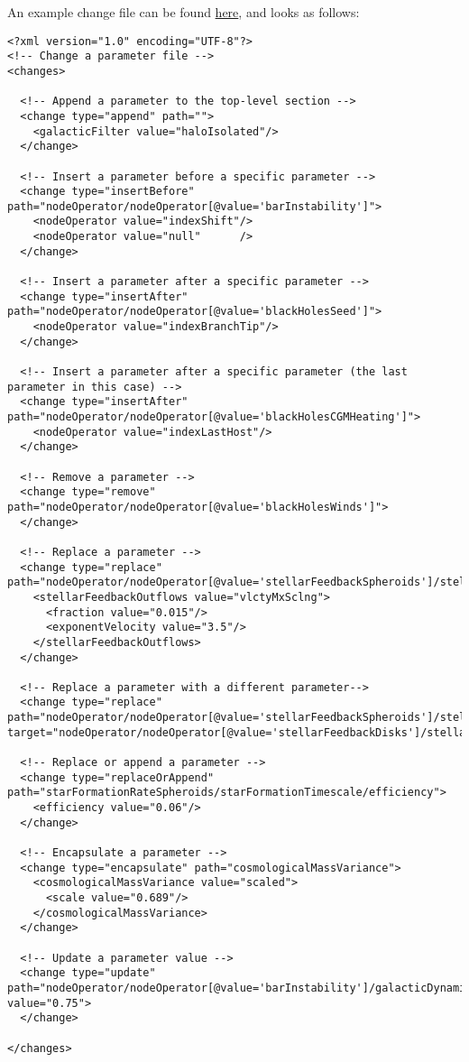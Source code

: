 An example change file can be found \href{https://raw.githubusercontent.com/galacticusorg/galacticus/master/testSuite/parameters/changes.xml}{here}, and looks as follows:
\begin{verbatim}
<?xml version="1.0" encoding="UTF-8"?>
<!-- Change a parameter file -->
<changes>

  <!-- Append a parameter to the top-level section -->
  <change type="append" path="">
    <galacticFilter value="haloIsolated"/>
  </change>

  <!-- Insert a parameter before a specific parameter -->
  <change type="insertBefore" path="nodeOperator/nodeOperator[@value='barInstability']">
    <nodeOperator value="indexShift"/>
    <nodeOperator value="null"      />
  </change>

  <!-- Insert a parameter after a specific parameter -->
  <change type="insertAfter" path="nodeOperator/nodeOperator[@value='blackHolesSeed']">
    <nodeOperator value="indexBranchTip"/>
  </change>

  <!-- Insert a parameter after a specific parameter (the last parameter in this case) -->
  <change type="insertAfter" path="nodeOperator/nodeOperator[@value='blackHolesCGMHeating']">
    <nodeOperator value="indexLastHost"/>
  </change>

  <!-- Remove a parameter -->
  <change type="remove" path="nodeOperator/nodeOperator[@value='blackHolesWinds']">
  </change>

  <!-- Replace a parameter -->
  <change type="replace" path="nodeOperator/nodeOperator[@value='stellarFeedbackSpheroids']/stellarFeedbackOutflows/stellarFeedbackOutflows">
    <stellarFeedbackOutflows value="vlctyMxSclng">
      <fraction value="0.015"/>
      <exponentVelocity value="3.5"/>
    </stellarFeedbackOutflows>
  </change>

  <!-- Replace a parameter with a different parameter-->
  <change type="replace" path="nodeOperator/nodeOperator[@value='stellarFeedbackSpheroids']/stellarFeedbackOutflows/stellarFeedbackOutflows" target="nodeOperator/nodeOperator[@value='stellarFeedbackDisks']/stellarFeedbackOutflows/stellarFeedbackOutflows"/>

  <!-- Replace or append a parameter -->
  <change type="replaceOrAppend" path="starFormationRateSpheroids/starFormationTimescale/efficiency">
    <efficiency value="0.06"/>
  </change>

  <!-- Encapsulate a parameter -->
  <change type="encapsulate" path="cosmologicalMassVariance">
    <cosmologicalMassVariance value="scaled">
      <scale value="0.689"/>
    </cosmologicalMassVariance>
  </change>

  <!-- Update a parameter value -->
  <change type="update" path="nodeOperator/nodeOperator[@value='barInstability']/galacticDynamicsBarInstability/stabilityThresholdGaseous" value="0.75">
  </change>

</changes>
\end{verbatim}
